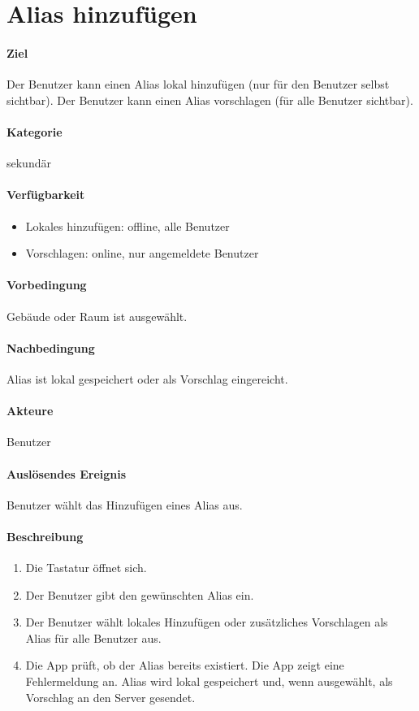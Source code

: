 \section{Alias hinzufügen}
\paragraph{Ziel}
Der Benutzer kann einen Alias lokal hinzufügen (nur für den Benutzer selbst sichtbar). Der Benutzer kann einen Alias vorschlagen (für alle Benutzer sichtbar).
\paragraph{Kategorie}
sekundär
\paragraph{Verfügbarkeit}
\begin{itemize}
    \item Lokales hinzufügen: offline, alle Benutzer
    \item Vorschlagen: online, nur angemeldete Benutzer
\end{itemize}

\paragraph{Vorbedingung}
Gebäude oder Raum ist ausgewählt.
\paragraph{Nachbedingung}
Alias ist lokal gespeichert oder als Vorschlag eingereicht.
\paragraph{Akteure}
Benutzer
\paragraph{Auslösendes Ereignis}
Benutzer wählt das Hinzufügen eines Alias aus.
\paragraph{Beschreibung}
\begin{enumerate}
    \item Die Tastatur öffnet sich.
    \item Der Benutzer gibt den gewünschten Alias ein.
    \item Der Benutzer wählt lokales Hinzufügen oder zusätzliches Vorschlagen als Alias für alle Benutzer aus.
    \item Die App prüft, ob der Alias bereits existiert.
     Die App zeigt eine Fehlermeldung an.
     Alias wird lokal gespeichert und, wenn ausgewählt, als Vorschlag an den Server gesendet.
\end{enumerate}
